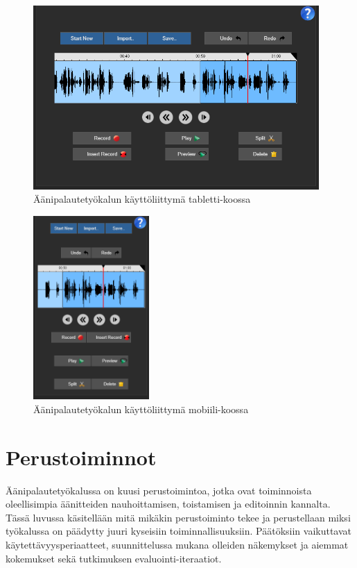 \documentclass[utf8]{gradu3}
\begin{document}
\begin{figure}[H]\centering
  \includegraphics[height=7cm,keepaspectratio]{UI_tablet}
  \caption[]{Äänipalautetyökalun käyttöliittymä tabletti-koossa}
  \label{fig:UI_tablet}
\end{figure}

\begin{figure}[H]\centering
  \includegraphics[height=7cm,keepaspectratio]{UI_mobile}
  \caption[]{Äänipalautetyökalun käyttöliittymä mobiili-koossa}
  \label{fig:UI_mobile}
\end{figure}

\section{Perustoiminnot}

Äänipalautetyökalussa on kuusi perustoimintoa, jotka ovat toiminnoista oleellisimpia äänitteiden nauhoittamisen, toistamisen ja editoinnin kannalta. Tässä luvussa käsitellään mitä mikäkin perustoiminto tekee ja perustellaan miksi työkalussa on päädytty juuri kyseisiin toiminnallisuuksiin. Päätöksiin vaikuttavat käytettävyysperiaatteet, suunnittelussa mukana olleiden näkemykset ja aiemmat kokemukset sekä tutkimuksen evaluointi-iteraatiot.
\end{document}
